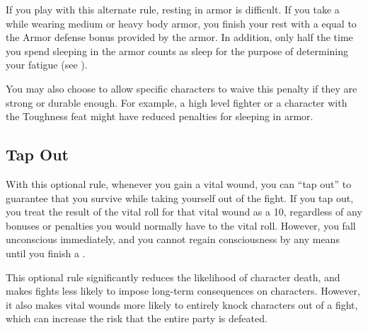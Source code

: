     If you play with this alternate rule, resting in armor is difficult.
    If you take a  while wearing medium or heavy body armor, you finish your rest with a  equal to the Armor defense bonus provided by the armor.
    In addition, only half the time you spend sleeping in the armor counts as sleep for the purpose of determining your fatigue (see ).

    You may also choose to allow specific characters to waive this penalty if they are strong or durable enough.
    For example, a high level fighter or a character with the Toughness feat might have reduced penalties for sleeping in armor.

  \subsection{Tap Out}
    With this optional rule, whenever you gain a vital wound, you can ``tap out'' to guarantee that you survive while taking yourself out of the fight.
    If you tap out, you treat the result of the vital roll for that vital wound as a 10, regardless of any bonuses or penalties you would normally have to the vital roll.
    However, you fall unconscious immediately, and you cannot regain consciousness by any means until you finish a .

    This optional rule significantly reduces the likelihood of character death, and makes fights less likely to impose long-term consequences on characters.
    However, it also makes vital wounds more likely to entirely knock characters out of a fight, which can increase the risk that the entire party is defeated.
